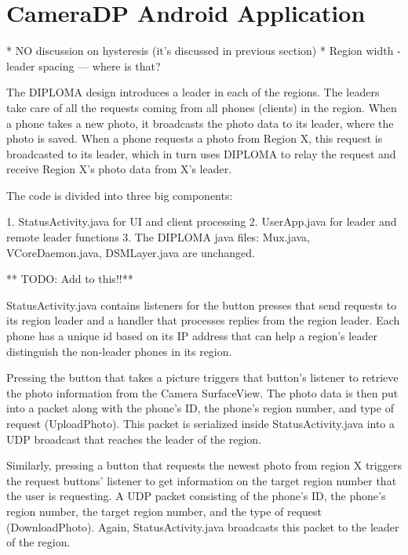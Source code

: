 \chapter{CameraDP Android Application}
* NO discussion on hysteresis (it's discussed in previous section)
* Region width - leader spacing --- where is that?

The DIPLOMA design introduces a leader in each of the regions.  The leaders take care of all the requests coming from all phones (clients) in the region.  When a phone takes a new photo, it broadcasts the photo data to its leader, where the photo is saved. When a phone requests a photo from Region X, this request is broadcasted to its leader, which in turn uses DIPLOMA to relay the request and receive Region X’s photo data from X’s leader.

The code is divided into three big components: 

1.  StatusActivity.java for UI and client processing
2.  UserApp.java for leader and remote leader functions
3.  The DIPLOMA java files: Mux.java, VCoreDaemon.java, DSMLayer.java are unchanged.

** TODO: Add to this!!**

StatusActivity.java contains listeners for the button presses that send requests to its region leader and a handler that processes replies from the region leader. Each phone has a unique id based on its IP address that can help a region’s leader distinguish the non-leader phones in its region.  

Pressing the button that takes a picture triggers that button’s listener to retrieve the photo information from the Camera SurfaceView. The photo data is then put into a packet along with the phone’s ID, the phone’s region number, and type of request (UploadPhoto). This packet is serialized inside StatusActivity.java into a UDP broadcast that reaches the leader of the region.

Similarly, pressing a button that requests the newest photo from region X triggers the request buttons’ listener to get information on the target region number that the user is requesting. A UDP packet consisting of the phone’s ID, the phone’s region number, the target region number, and the type of request (DownloadPhoto). Again, StatusActivity.java broadcasts this packet to the leader of the region.

